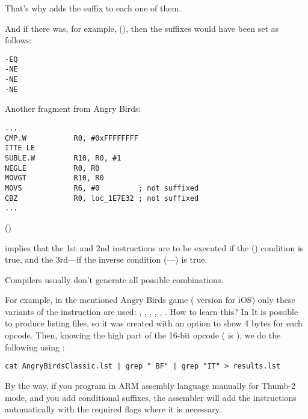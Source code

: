 That's why \IDA adds the  suffix to each one of them. 

And if there was, for example,  (), 
then the suffixes would have been set as follows:

\begin{lstlisting}
-EQ
-NE
-NE
-NE
\end{lstlisting}

Another fragment from Angry Birds:

\begin{lstlisting}[caption=Angry Birds Classic]
...
CMP.W           R0, #0xFFFFFFFF
ITTE LE
SUBLE.W         R10, R0, #1
NEGLE           R0, R0
MOVGT           R10, R0
MOVS            R6, #0         ; not suffixed
CBZ             R0, loc_1E7E32 ; not suffixed
...
\end{lstlisting}

 () 

implies that the 1st and 2nd instructions are to be executed if the  ()
condition is true, and the 3rd---if the inverse condition (---) 
is true.

Compilers usually don't generate all possible combinations.

For example, in the mentioned Angry Birds game ( version for iOS)
only these variants of the  instruction are used: 
, , , , , .
\myindex{\GrepUsage}
How to learn this?
In \IDA It is possible to produce listing files, so it was created with an option to show 4 bytes for each opcode.
Then, knowing the high part of the 16-bit opcode ( is ), we do the following using :

\begin{lstlisting}
cat AngryBirdsClassic.lst | grep " BF" | grep "IT" > results.lst
\end{lstlisting}


By the way, if you program in ARM assembly language manually for Thumb-2 mode, 
and you add conditional suffixes,
the assembler will add the  instructions automatically with the required flags where it is necessary.

\myparagraph{\NonOptimizingXcodeIV (\ARMMode)}

